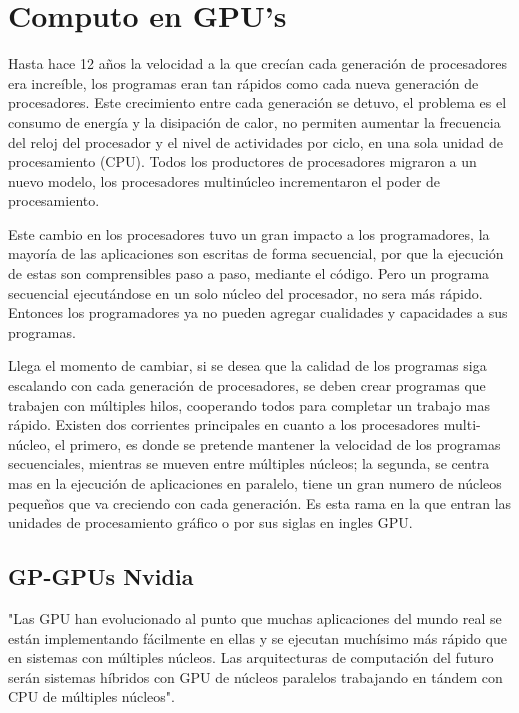 \chapter{Computo en GPU's}
Hasta hace 12 años la velocidad a la que crecían cada generación de procesadores era increíble, los programas eran tan rápidos como cada nueva generación de procesadores. Este crecimiento entre cada generación se detuvo, el problema es el consumo de energía y la disipación de calor, no permiten aumentar la frecuencia del reloj del procesador y el nivel de actividades por ciclo, en una sola unidad de procesamiento (CPU). Todos los productores de procesadores migraron a un nuevo modelo, los procesadores multinúcleo incrementaron el poder de procesamiento.

Este cambio en los procesadores tuvo un gran impacto a los programadores, la mayoría de las aplicaciones son escritas de forma secuencial,  por que la ejecución de estas son comprensibles paso a paso, mediante el código. Pero un programa secuencial ejecutándose en un solo núcleo del procesador, no sera más rápido. Entonces los programadores ya no pueden agregar cualidades y capacidades a sus programas.

Llega el momento de cambiar, si se desea que la calidad de los programas siga escalando con cada generación de procesadores, se deben crear programas que trabajen con múltiples hilos, cooperando todos para completar un trabajo mas rápido. Existen dos corrientes principales en cuanto a los procesadores multi-núcleo, el primero, es donde se pretende mantener la velocidad de los programas secuenciales, mientras se mueven entre múltiples núcleos; la segunda, se centra mas en la ejecución de aplicaciones en paralelo, tiene un gran numero de núcleos pequeños que va creciendo con cada generación. Es esta rama en la que entran las unidades de procesamiento gráfico o por sus siglas en ingles GPU.\cite{Kirk2010}

\section{GP-GPUs Nvidia}

"Las GPU han evolucionado al punto que muchas aplicaciones del mundo real se están implementando fácilmente en ellas y se ejecutan muchísimo más rápido que en sistemas con múltiples núcleos. Las arquitecturas de computación del futuro serán sistemas híbridos con GPU de núcleos paralelos trabajando en tándem con CPU de múltiples núcleos".\cite{GPUIntro}

